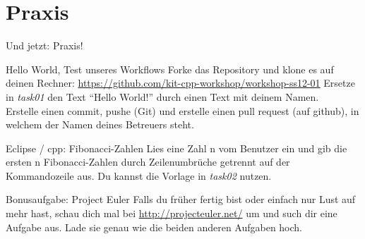 \section{Praxis}
\begin{frame}{Und jetzt: Praxis!}
	\small{
	\begin{block}{Hello World, Test unseres Workflows}
		Forke das Repository und klone es auf deinen Rechner:
		\url{https://github.com/kit-cpp-workshop/workshop-ss12-01}
		Ersetze in \emph{task01} den Text \enquote{Hello World!} durch einen Text mit deinem Namen.\\
		Erstelle einen commit, pushe (Git) und erstelle einen pull request (auf github), in welchem der Namen deines Betreuers steht.
	\end{block}
	
	\begin{block}{Eclipse / cpp: Fibonacci-Zahlen}
		Lies eine Zahl n vom Benutzer ein und gib die ersten n Fibonacci-Zahlen durch Zeilenumbrüche getrennt auf der Kommandozeile aus. Du kannst die Vorlage in \emph{task02} nutzen.
	\end{block}
	
	\begin{block}{Bonusaufgabe: Project Euler}
		Falls du früher fertig bist oder einfach nur Lust auf mehr hast, schau dich mal bei \url{http://projecteuler.net/} um und such dir eine Aufgabe aus. Lade sie genau wie die beiden anderen Aufgaben hoch.
	\end{block}
	}
\end{frame}
